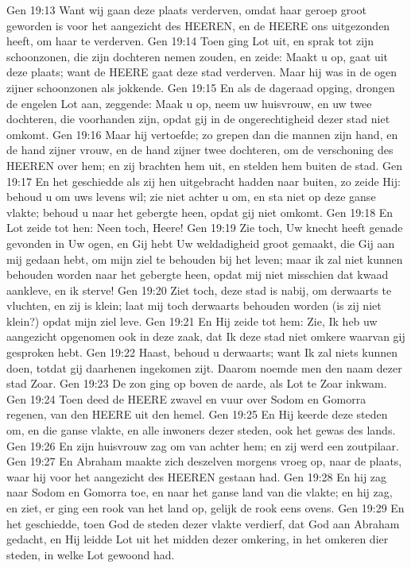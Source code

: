 Gen 19:13  Want wij gaan deze plaats verderven, omdat haar geroep groot geworden is voor het aangezicht des HEEREN, en de HEERE ons uitgezonden heeft, om haar te verderven.
Gen 19:14  Toen ging Lot uit, en sprak tot zijn schoonzonen, die zijn dochteren nemen zouden, en zeide: Maakt u op, gaat uit deze plaats; want de HEERE gaat deze stad verderven. Maar hij was in de ogen zijner schoonzonen als jokkende.
Gen 19:15  En als de dageraad opging, drongen de engelen Lot aan, zeggende: Maak u op, neem uw huisvrouw, en uw twee dochteren, die voorhanden zijn, opdat gij in de ongerechtigheid dezer stad niet omkomt.
Gen 19:16  Maar hij vertoefde; zo grepen dan die mannen zijn hand, en de hand zijner vrouw, en de hand zijner twee dochteren, om de verschoning des HEEREN over hem; en zij brachten hem uit, en stelden hem buiten de stad.
Gen 19:17  En het geschiedde als zij hen uitgebracht hadden naar buiten, zo zeide Hij: behoud u om uws levens wil; zie niet achter u om, en sta niet op deze ganse vlakte; behoud u naar het gebergte heen, opdat gij niet omkomt.
Gen 19:18  En Lot zeide tot hen: Neen toch, Heere!
Gen 19:19  Zie toch, Uw knecht heeft genade gevonden in Uw ogen, en Gij hebt Uw weldadigheid groot gemaakt, die Gij aan mij gedaan hebt, om mijn ziel te behouden bij het leven; maar ik zal niet kunnen behouden worden naar het gebergte heen, opdat mij niet misschien dat kwaad aankleve, en ik sterve!
Gen 19:20  Ziet toch, deze stad is nabij, om derwaarts te vluchten, en zij is klein; laat mij toch derwaarts behouden worden (is zij niet klein?) opdat mijn ziel leve.
Gen 19:21  En Hij zeide tot hem: Zie, Ik heb uw aangezicht opgenomen ook in deze zaak, dat Ik deze stad niet omkere waarvan gij gesproken hebt.
Gen 19:22  Haast, behoud u derwaarts; want Ik zal niets kunnen doen, totdat gij daarhenen ingekomen zijt. Daarom noemde men den naam dezer stad Zoar.
Gen 19:23  De zon ging op boven de aarde, als Lot te Zoar inkwam.
Gen 19:24  Toen deed de HEERE zwavel en vuur over Sodom en Gomorra regenen, van den HEERE uit den hemel.
Gen 19:25  En Hij keerde deze steden om, en die ganse vlakte, en alle inwoners dezer steden, ook het gewas des lands.
Gen 19:26  En zijn huisvrouw zag om van achter hem; en zij werd een zoutpilaar.
Gen 19:27  En Abraham maakte zich deszelven morgens vroeg op, naar de plaats, waar hij voor het aangezicht des HEEREN gestaan had.
Gen 19:28  En hij zag naar Sodom en Gomorra toe, en naar het ganse land van die vlakte; en hij zag, en ziet, er ging een rook van het land op, gelijk de rook eens ovens.
Gen 19:29  En het geschiedde, toen God de steden dezer vlakte verdierf, dat God aan Abraham gedacht, en Hij leidde Lot uit het midden dezer omkering, in het omkeren dier steden, in welke Lot gewoond had.
